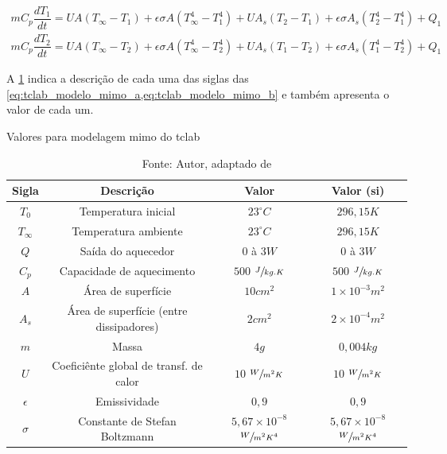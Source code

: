 \begin{subequations}
	\label{eq:tclab_modelo_mimo}
	\begin{gather}
		mC_p \dfrac{dT_1}{dt} = UA (T_{\infty} - T_1) + \epsilon \sigma A (T_{\infty}^{4} - T_{1}^{4}) + UA_s (T_2 - T_1) + \epsilon \sigma A_s (T_{2}^{4} - T_{1}^{4}) + Q_1		\label{eq:tclab_modelo_mimo_a} \\
		mC_p \dfrac{dT_2}{dt} = UA (T_{\infty} - T_2) + \epsilon \sigma A (T_{\infty}^{4} - T_{2}^{4}) + UA_s (T_1 - T_2) + \epsilon \sigma A_s (T_{1}^{4} - T_{2}^{4}) + Q_1		\label{eq:tclab_modelo_mimo_b}
	\end{gather}
\end{subequations}

A \cref{tab:tclab_modelo_mimo_valores} indica a descrição de cada uma das siglas das
\cref{eq:tclab_modelo_mimo_a,eq:tclab_modelo_mimo_b} e também apresenta o valor de cada um.

\begin{table}[h]
	\centering
	\caption{Valores para modelagem \acrshort{mimo} do \acrshort{tclab}}
	\label{tab:tclab_modelo_mimo_valores}
	\begin{tabular}{cccc} \toprule
		{Sigla} 		& {Descrição} 								& {Valor} 											& {Valor (\acrshort{si})} 							\\ \midrule
		$T_{0}$ 		& Temperatura inicial 						& $23^\circ C$ 										& $296{,}15 K $										\\
		$T_{\infty}$	& Temperatura ambiente						& $23^\circ C$										& $296{,}15 K $										\\
		$Q$				& Saída do aquecedor						& $0$ à $3 W$										& $0$ à $3 W$										\\
		$C_p$			& Capacidade de aquecimento					& $500$ $\sfrac{J}{kg.K}$							& $500$ $\sfrac{J}{kg.K}$							\\
		$A$				& Área de superfície						& $10 cm^{2}$										& $1{\times}10^{-3} m^{2}$							\\
		$A_s$			& Área de superfície (entre dissipadores)	& $2 cm^{2}$										& $2{\times}10^{-4} m^{2}$							\\
		$m$				& Massa										& $4 g$												& $0{,}004 kg	$									\\
		$U$				& Coeficiênte global de transf. de calor	& $10$ $\sfrac{W}{m^{2}K}$							& $10$ $\sfrac{W}{m^{2}K}$							\\
		$\epsilon$		& Emissividade								& $0{,}9$											& $0{,}9$											\\
		$\sigma$		& Constante de Stefan Boltzmann				& $5{,}67{\times}10^{-8}$ $\sfrac{W}{m^{2}K^{4}}$	& $5{,}67{\times}10^{-8}$ $\sfrac{W}{m^{2}K^{4}}$	\\ \bottomrule
	\end{tabular}
	\caption*{Fonte: Autor, adaptado de }
\end{table}